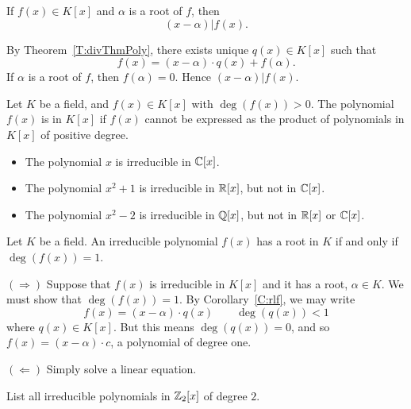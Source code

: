 \documentclass{ximera}
\begin{document}
\begin{corollary}\label{C:rlf}
  If $f(x)\in K[x]$ and $\alpha$ is a root of $f$, then
  \[
  (x-\alpha) | f(x).
  \]
  \begin{sketch}
  By Theorem~\ref{T:divThmPoly}, there exists unique $q(x)\in K[x]$
  such that
  \[
  f(x) = (x-\alpha)\cdot q(x) + f(\alpha).
  \]
  If $\alpha$ is a root of $f$, then $f(\alpha) = 0$. Hence
  $(x-\alpha) | f(x)$.
  \end{sketch}
\end{corollary}



\begin{definition}
  Let $K$ be a field, and $f(x)\in K[x]$ with $\deg(f(x))>0$. The
  polynomial $f(x)$ is  in $K[x]$ if $f(x)$ cannot be
  expressed as the product of polynomials in $K[x]$ of positive
  degree.
\end{definition}

\begin{example}\hfil
  \begin{itemize}
  \item The polynomial $x$ is irreducible in $\mathbb C[x]$.
  \item The polynomial $x^2+1$ is irreducible in $\mathbb R[x]$, but not in
    $\mathbb C[x]$.
  \item The polynomial $x^2-2$ is irreducible in $\mathbb Q[x]$, but not in
    $\mathbb R[x]$ or $\mathbb C[x]$.
  \end{itemize}
\end{example}

\begin{corollary}
  Let $K$ be a field. An irreducible polynomial $f(x)$ has a root in
  $K$ if and only if $\deg(f(x))= 1$.
  \begin{sketch}
    $(\Rightarrow)$ Suppose that $f(x)$ is irreducible in $K[x]$ and
    it has a root, $\alpha\in K$. We must show that $\deg(f(x))=
    1$. By Corollary~\ref{C:rlf}, we may write
    \[
    f(x) = (x-\alpha)\cdot q(x)\qquad\deg(q(x))< 1
    \]
    where $q(x)\in K[x]$. But this means $\deg(q(x)) = 0$, and so
    $f(x) = (x-\alpha)\cdot c$, a polynomial of degree one.


    $(\Leftarrow)$ Simply solve a linear equation.
  \end{sketch}
\end{corollary}

\begin{exercise}
  List all irreducible polynomials in $\mathbb Z_2[x]$ of degree $2$.
\end{exercise}
\end{document}

